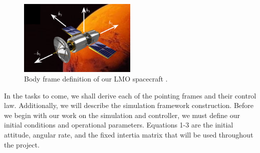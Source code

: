 \documentclass[paper]{aiaaNew}
\begin{document}
\begin{figure}[!htbp] 
\centering     %
{}
\end{figure}


\begin{figure}[!htbp] 
  \centering
  \includegraphics[width=0.5\textwidth]{Figures/sc_body.PNG}
  \caption{Body frame definition of our LMO spacecraft \cite{sheet}.}
  \label{fig:sc}
\end{figure}

In the tasks to come, we shall derive each of the pointing frames and their control law. Additionally, we will describe the simulation framework construction. Before we begin with our work on the simulation and controller, we must define our initial conditions and operational parameters. Equations 1-3 are the initial attitude, angular rate, and the fixed intertia matrix that will be used throughout the project.
\end{document}
